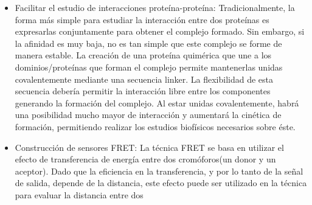 \begin{itemize}
\item Facilitar el estudio de interacciones proteína-proteína\cite{reddy2013linkers}: 
Tradicionalmente, la forma más simple para estudiar la interacción entre dos proteínas es expresarlas conjuntamente para obtener el complejo formado.
Sin embargo, si la afinidad es muy baja, no es tan simple que este complejo se forme de manera estable.
La creación de una proteína quimérica que une a los dominios/proteínas que forman el complejo permite mantenerlas unidas covalentemente mediante una secuencia linker.
La flexibilidad de esta secuencia debería permitir la interacción libre entre los componentes generando la formación del complejo. Al estar unidas covalentemente, habrá una posibilidad mucho mayor de interacción y aumentará la cinética de 
formación, permitiendo realizar los estudios biofísicos necesarios sobre éste.
\item Construcción de sensores FRET:
La técnica FRET se basa en utilizar el efecto de transferencia de energía entre dos cromóforos(un donor y un aceptor).
Dado que la eficiencia en la transferencia, y por lo tanto de la señal de salida, depende de la distancia, este efecto puede ser utilizado en la técnica para evaluar la distancia entre dos 

\end{itemize}
